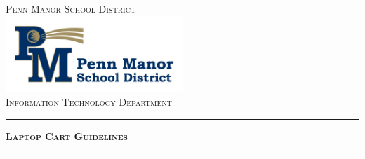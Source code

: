 \begin{titlepage}

\begin{center}

\textsc{\LARGE Penn Manor School District}\\[1.5cm]


\includegraphics[width=0.5\textwidth]{images/logo}\\[1cm]


\textsc{\Large Information Technology Department}\\[0.5cm]


\hrule
\huge \bfseries \textsc{Laptop Cart Guidelines}\\[0.4cm]
\hrule
\end{center}

\vfill
{}


\end{titlepage}
